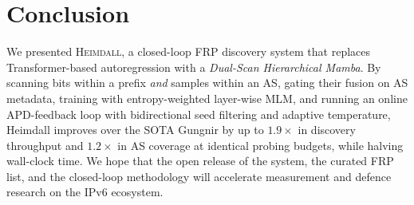 \documentclass[conference]{IEEEtran}
\begin{document}
\section{Conclusion}\label{sec:concl}
We presented \textsc{Heimdall}, a closed-loop FRP discovery system
that replaces Transformer-based autoregression with a \emph{Dual-Scan
Hierarchical Mamba}.  By scanning bits within a prefix \emph{and}
samples within an AS, gating their fusion on AS metadata, training
with entropy-weighted layer-wise MLM, and running an online
APD-feedback loop with bidirectional seed filtering and adaptive
temperature, Heimdall improves over the SOTA Gungnir by up to
$1.9\times$ in discovery throughput and $1.2\times$ in AS coverage at
identical probing budgets, while halving wall-clock time.  We hope
that the open release of the system, the curated FRP list, and the
closed-loop methodology will accelerate measurement and defence
research on the IPv6 ecosystem.
\end{document}
